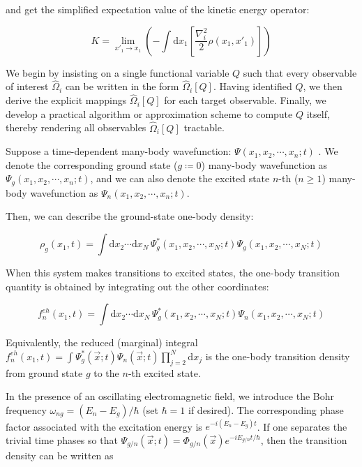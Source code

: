 and get the simplified expectation value of the kinetic energy operator:

\begin{equation}
K= \lim_{x'_1\to x_1}\left( -\int\mathrm{d}x_1\left[\frac{\nabla_i^2}{2}\rho(x_1,x'_1) \right]\right)
\label{kinetic_energy_density_matrix}
\end{equation}

We begin by insisting on a single functional variable $Q$ such that every observable of interest $\hat\Omega_i$ can be written in the form $\hat\Omega_i[Q]$. Having identified $Q$, we then derive the explicit mappings $\hat\Omega_i[Q]$ for each target observable. Finally, we develop a practical algorithm or approximation scheme to compute $Q$ itself, thereby rendering all observables $\hat\Omega_i[Q]$ tractable.

Suppose a time-dependent many-body wavefunction: $\Psi(x_1,x_2,\cdots,x_n;t)$ . We denote the corresponding ground state ($g\coloneqq0$) many-body wavefunction as $\Psi_g(x_1,x_2,\cdots,x_n;t)$, and we can also denote the excited state $n$-th ($n\geq1$) many-body wavefunction as $\Psi_n(x_1,x_2,\cdots,x_n;t)$.

Then, we can describe the ground-state one-body density:

\begin{equation}
\rho_g(x_1,t)=\int \mathrm{d}x_2\cdots\mathrm{d}x_N\,\Psi_g^*(x_1,x_2,\cdots,x_N;t)\Psi_g(x_1,x_2,\cdots,x_N;t)
\label{ground_one-body_density}
\end{equation}

When this system makes transitions to excited states, the one-body transition quantity is obtained by integrating out the other coordinates:

\begin{equation}
f_n^{eh}(x_1,t)=\int \mathrm{d}x_2\cdots\mathrm{d}x_N\,\Psi_g^*(x_1,x_2,\cdots,x_N;t)\Psi_n(x_1,x_2,\cdots,x_N;t)
\label{transition_one-body}
\end{equation}

Equivalently, the reduced (marginal) integral $f_n^{eh}(x_1,t)=\int\Psi_g^*(\vec{x};t)\Psi_n(\vec{x};t)\prod^N_{j=2}\mathrm{d}x_j$ is the one-body transition density from ground state $g$ to the $n$-th excited state.

In the presence of an oscillating electromagnetic field, we introduce the Bohr frequency 
$\omega_{ng}=(E_n-E_g)/\hbar$ (set $\hbar=1$ if desired). The corresponding phase factor associated with the excitation energy is $e^{-i(E_n-E_g)t}$.
If one separates the trivial time phases so that $\Psi_{g/n}(\vec{x};t)=\Phi_{g/n}(\vec{x})e^{-iE_{g/n}t/\hbar}$, then the transition density can be written as

